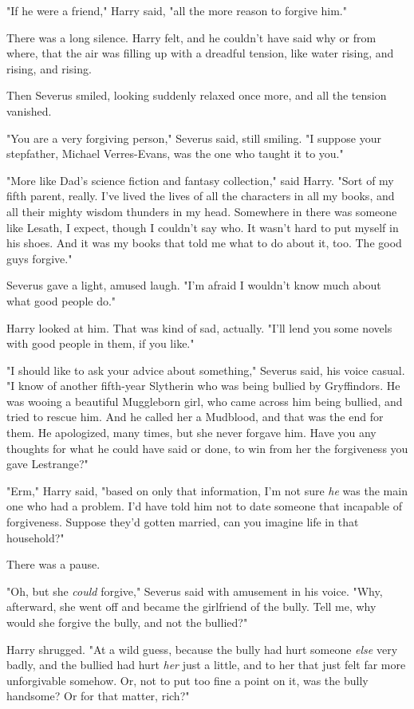 "If he were a friend," Harry said, "all the more reason to forgive him."

There was a long silence. Harry felt, and he couldn't have said why or from
where, that the air was filling up with a dreadful tension, like water rising,
and rising, and rising.

Then Severus smiled, looking suddenly relaxed once more, and all the tension
vanished.

"You are a very forgiving person," Severus said, still smiling. "I suppose your
stepfather, Michael Verres-Evans, was the one who taught it to you."

"More like Dad's science fiction and fantasy collection," said Harry. "Sort of
my fifth parent, really. I've lived the lives of all the characters in all my
books, and all their mighty wisdom thunders in my head. Somewhere in there was
someone like Lesath, I expect, though I couldn't say who. It wasn't hard to put
myself in his shoes. And it was my books that told me what to do about it, too.
The good guys forgive."

Severus gave a light, amused laugh. "I'm afraid I wouldn't know much about what
good people do."

Harry looked at him. That was kind of sad, actually. "I'll lend you some novels
with good people in them, if you like."

"I should like to ask your advice about something," Severus said, his voice
casual. "I know of another fifth-year Slytherin who was being bullied by
Gryffindors. He was wooing a beautiful Muggleborn girl, who came across him
being bullied, and tried to rescue him. And he called her a Mudblood, and that
was the end for them. He apologized, many times, but she never forgave him.
Have you any thoughts for what he could have said or done, to win from her the
forgiveness you gave Lestrange?"

"Erm," Harry said, "based on only that information, I'm not sure \emph{he} was
the main one who had a problem. I'd have told him not to date someone that
incapable of forgiveness. Suppose they'd gotten married, can you imagine life
in that household?"

There was a pause.

"Oh, but she \emph{could} forgive," Severus said with amusement in his voice.
"Why, afterward, she went off and became the girlfriend of the bully. Tell me,
why would she forgive the bully, and not the bullied?"

Harry shrugged. "At a wild guess, because the bully had hurt someone
\emph{else} very badly, and the bullied had hurt \emph{her} just a little, and
to her that just felt far more unforgivable somehow. Or, not to put too fine a
point on it, was the bully handsome? Or for that matter, rich?"

